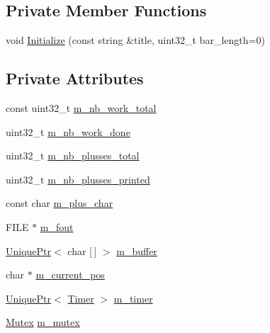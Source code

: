 \subsection*{Private Member Functions}
\begin{DoxyCompactItemize}
\item 
void \hyperlink{classmage_1_1_progress_reporter_a173a7b0097791410d2a513129cbb80b8}{Initialize} (const string \&title, uint32\+\_\+t bar\+\_\+length=0)
\end{DoxyCompactItemize}
\subsection*{Private Attributes}
\begin{DoxyCompactItemize}
\item 
const uint32\+\_\+t \hyperlink{classmage_1_1_progress_reporter_a1b0c8d8f3cde82161b34897c5e95e09b}{m\+\_\+nb\+\_\+work\+\_\+total}
\item 
uint32\+\_\+t \hyperlink{classmage_1_1_progress_reporter_ad3cb941594f138c208fa522a355a985b}{m\+\_\+nb\+\_\+work\+\_\+done}
\item 
uint32\+\_\+t \hyperlink{classmage_1_1_progress_reporter_aeae54fa7c542ccfbdaa44c0942c483fd}{m\+\_\+nb\+\_\+plusses\+\_\+total}
\item 
uint32\+\_\+t \hyperlink{classmage_1_1_progress_reporter_a17d7a4f8b2c8a6de255786f6165726bd}{m\+\_\+nb\+\_\+plusses\+\_\+printed}
\item 
const char \hyperlink{classmage_1_1_progress_reporter_ab3c8d12e79e63ae2b99fde8d6627c230}{m\+\_\+plus\+\_\+char}
\item 
F\+I\+LE $\ast$ \hyperlink{classmage_1_1_progress_reporter_ad325ee5978fd1d16a97acbe37a977982}{m\+\_\+fout}
\item 
\hyperlink{namespacemage_a8c307fbcc33bce9b7f2aa4c26c3b95cf}{Unique\+Ptr}$<$ char \mbox{[}$\,$\mbox{]} $>$ \hyperlink{classmage_1_1_progress_reporter_a725763db34f5bbb7408107d55ee43beb}{m\+\_\+buffer}
\item 
char $\ast$ \hyperlink{classmage_1_1_progress_reporter_a7adafaaf90edf29c8c27f4008aea41c9}{m\+\_\+current\+\_\+pos}
\item 
\hyperlink{namespacemage_a8c307fbcc33bce9b7f2aa4c26c3b95cf}{Unique\+Ptr}$<$ \hyperlink{classmage_1_1_timer}{Timer} $>$ \hyperlink{classmage_1_1_progress_reporter_a4c5c81ce84ceaab7764bd640a18db788}{m\+\_\+timer}
\item 
\hyperlink{structmage_1_1_mutex}{Mutex} \hyperlink{classmage_1_1_progress_reporter_a32a499aa1b8fccbc8393fe32305dfeb1}{m\+\_\+mutex}
\end{DoxyCompactItemize}


